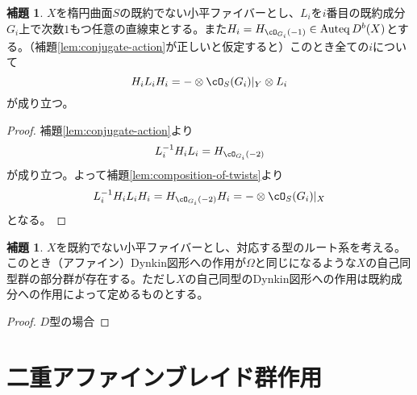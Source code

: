 \documentclass[uplatex, a4paper, dvipdfmx]{jsarticle}
\theoremstyle{definition}
\newtheorem{lemma}[theorem]{補題}
\DeclareMathOperator{\Auteq}{\mathrm{Auteq}}
\begin{document}
\begin{lemma}
    $X$を楕円曲面$S$の既約でない小平ファイバーとし、$L_i$を$i$番目の既約成分$G_i$上で次数$1$もつ任意の直線束とする。また$H_i = H_{\cO_{G_i}(-1)} \in \Auteq D^b(X)$とする。（補題\ref{lem:conjugate-action}が正しいと仮定すると）このとき全ての$i$について
    \begin{equation}
        H_iL_iH_i = -\otimes \cO_S(G_i)\vert_Y \otimes L_i
    \end{equation}
    が成り立つ。
\end{lemma}
\begin{proof}
    補題\ref{lem:conjugate-action}より
    \begin{equation}
        L_i^{-1}H_iL_i = H_{\cO_{G_i}(-2)}
    \end{equation}
    が成り立つ。よって補題\ref{lem:composition-of-twists}より
    \begin{equation}
        L_i^{-1}H_iL_iH_i = H_{\cO_{G_i}(-2)}H_i = -\otimes \cO_S(G_i)\vert_X
    \end{equation}
    となる。
\end{proof}
\begin{lemma}\label{lem:omega_in_automorphisms}
    $X$を既約でない小平ファイバーとし、対応する型のルート系を考える。このとき（アファイン）Dynkin図形への作用が$\Omega$と同じになるような$X$の自己同型群の部分群が存在する。ただし$X$の自己同型のDynkin図形への作用は既約成分への作用によって定めるものとする。
\end{lemma}
\begin{proof}
    $D$型の場合
\end{proof}


\section{二重アファインブレイド群作用}
\end{document}
